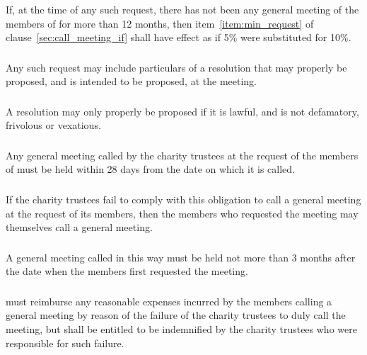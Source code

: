         \subsubsection{}
        If, at the time of any such request, there has not been any general meeting of the members of \shortname{} for more than 12 months, then item~\ref{item:min_request} of clause~\ref{sec:call_meeting_if} shall have effect as if 5\% were substituted for 10\%.

        \subsubsection{}
        Any such request may include particulars of a resolution that may properly be proposed, and is intended to be proposed, at the meeting.

        \subsubsection{}
        A resolution may only properly be proposed if it is lawful, and is not defamatory, frivolous or vexatious.

        \subsubsection{}
        Any general meeting called by the charity trustees at the request of the members of \shortname{} must be held within 28 days from the date on which it is called.

        \subsubsection{}
        If the charity trustees fail to comply with this obligation to call a general meeting at the request of its members, then the members who requested the meeting may themselves call a general meeting.

        \subsubsection{}
        A general meeting called in this way must be held not more than 3 months after the date when the members first requested the meeting.

        \subsubsection{}
        \shortname{} must reimburse any reasonable expenses incurred by the members calling a general meeting by reason of the failure of the charity trustees to duly call the meeting, but \shortname{} shall be entitled to be indemnified by the charity trustees who were responsible for such failure.


